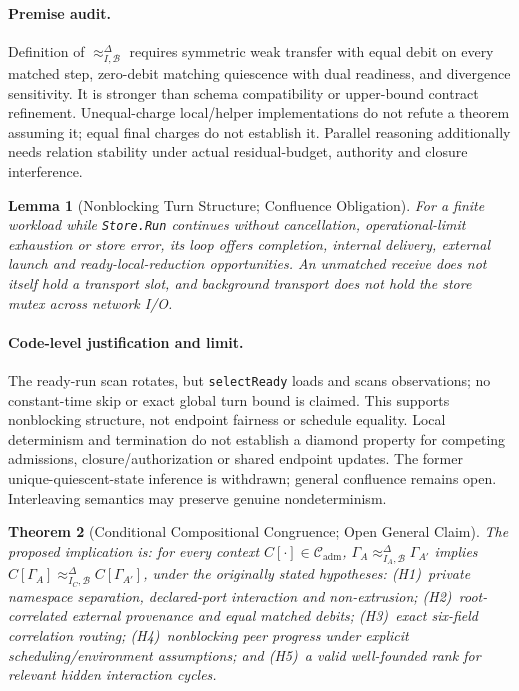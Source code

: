 \documentclass[11pt,a4paper]{article}
\newtheorem{theorem}{Theorem}[section]
\newtheorem{lemma}[theorem]{Lemma}
\theoremstyle{definition}
\theoremstyle{remark}
\begin{document}
\paragraph{Premise audit.} Definition of $\approx^{\Delta}_{I,\mathcal{B}}$ requires symmetric weak transfer with equal debit on every matched step, zero-debit matching quiescence with dual readiness, and divergence sensitivity. It is stronger than schema compatibility or upper-bound contract refinement. Unequal-charge local/helper implementations do not refute a theorem assuming it; equal final charges do not establish it. Parallel reasoning additionally needs relation stability under actual residual-budget, authority and closure interference.

\begin{lemma}[Nonblocking Turn Structure; Confluence Obligation]
\label{lem:scheduler}
For a finite workload while \texttt{Store.Run} continues without cancellation, operational-limit exhaustion or store error, its loop offers completion, internal delivery, external launch and ready-local-reduction opportunities. An unmatched receive does not itself hold a transport slot, and background transport does not hold the store mutex across network I/O.
\end{lemma}
\paragraph{Code-level justification and limit.} The ready-run scan rotates, but \texttt{selectReady} loads and scans observations; no constant-time skip or exact global turn bound is claimed. This supports nonblocking structure, not endpoint fairness or schedule equality. Local determinism and termination do not establish a diamond property for competing admissions, closure/authorization or shared endpoint updates. The former unique-quiescent-state inference is withdrawn; general confluence remains open. Interleaving semantics may preserve genuine nondeterminism.

\begin{theorem}[Conditional Compositional Congruence; Open General Claim]
\label{thm:congruence}
The proposed implication is: for every context $C[\cdot]\in\mathcal{C}_{\text{adm}}$, $\Gamma_A\approx^{\Delta}_{I_A,\mathcal{B}}\Gamma_{A'}$ implies $C[\Gamma_A]\approx^{\Delta}_{I_C,\mathcal{B}}C[\Gamma_{A'}]$, under the originally stated hypotheses: (H1)~private namespace separation, declared-port interaction and non-extrusion; (H2)~root-correlated external provenance and equal matched debits; (H3)~exact six-field correlation routing; (H4)~nonblocking peer progress under explicit scheduling/environment assumptions; and (H5)~a valid well-founded rank for relevant hidden interaction cycles.
\end{theorem}
\end{document}
